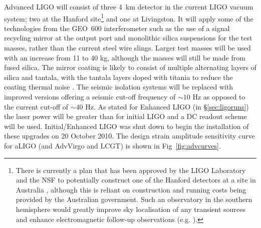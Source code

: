 \documentclass{article}
\begin{document}
Advanced LIGO will consist of three 4~km detector in the current LIGO vacuum system;
two at the Hanford site\footnote{There is currently a plan that
has been approved by the LIGO Laboratory and the NSF to potentially construct one of the 
Hanford detectors at a site in Australia \cite{Marx:2010}, although this is reliant
on construction and running costs being provided by the Australian government.
Such an observatory in the southern hemisphere would greatly improve sky localisation
of any transient sources and enhance electromagnetic follow-up observations (e.g. 
\cite{Barriga:2010}).} and one at Livingston. It will apply some of the
technologies from the GEO~600 interferometer such as the use of a signal
recycling mirror at the output port and monolithic silica suspensions for the
test masses, rather than the current steel wire slings. Larger test masses will
be used with an increase from 11 to 40 kg, although the masses will still be
made from fused silica. The mirror coating is likely to consist of multiple 
alternating layers of silica and tantala, with the tantala layers doped with 
titania to reduce the coating thermal noise \cite{Agresti:2006}. The seismic isolation systems will be
replaced with improved versions offering a seismic cut-off frequency of $\sim10$
Hz as opposed to the current cut-off of $\sim40$ Hz. As stated for Enhanced LIGO 
(in \S\ref{sec:ligoruns}) the laser power will be greater than for initial 
LIGO and a DC readout scheme will be used. Initial/Enhanced LIGO was shut down 
to begin the installation of these upgrades on 20 October 2010. The design
strain amplitude sensitivity curve for aLIGO (and AdvVirgo and LCGT) is shown
in Fig~\ref{fig:advcurves}.

\end{document}

